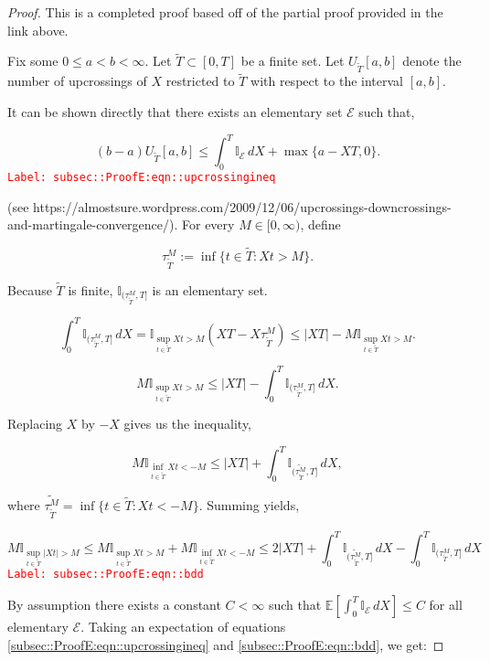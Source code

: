 \documentclass[12pt]{article}
\newcommand{\mb}{\mathbb}
\newcommand{\mc}{\mathcal}
\newcommand{\tr}{\textcolor{red}}
\newcommand{\labe}[1]{\tr{\texttt{Label: #1}}}
\newcommand{\ind}{\hspace{24pt}}
\newcommand{\ex}[1]{\mb{E}\left[#1\right]}			%
\newcommand{\T}{T}								%
\renewcommand{\t}{t}							%
\newcommand{\X}{X}								%
\newcommand{\const}{C}							%
\newcommand{\rt}[1]{\tau^{#1}}						%
\newcommand{\alt}{\widetilde}						%
\newcommand{\evnt}{\mc{E}}						%
\begin{document}
\begin{proof}
This is a completed proof based off of the partial proof provided in the link above.

\ind Fix some \(0\leq a < b < \infty\). Let \(\alt{T} \subset [0,\T]\) be a finite set. Let \(U_{\alt{\T}}[a,b]\) denote the number of upcrossings of \(\X{}{}\) restricted to \(\alt{\T}\) with respect to the interval \([a,b]\).

\ind It can be shown directly that there exists an elementary set \(\evnt\) such that,

\begin{equation}
(b-a)U_{\alt{T}}[a,b] \leq \int_0^\T \mb{I}_{\evnt}\,d\X{}{} + \max\{a - \X{}{\T},0\}.
\label{subsec::ProofE:eqn::upcrossingineq}
\end{equation}
\labe{subsec::ProofE:eqn::upcrossingineq}

(see https://almostsure.wordpress.com/2009/12/06/upcrossings-downcrossings-and-martingale-convergence/). For every \(M \in [0,\infty)\), define

\[\rt{M}_{\alt{T}} := \inf\{\t\in \alt{\T}: \X{}{\t} > M\}.\]

Because \(\alt{T}\) is finite, \(\mb{I}_{(\rt{M}_{\alt{T}},\T]}\) is an elementary set.

\[\int_0^\T \mb{I}_{(\rt{M}_{\alt{T}},\T]}\,d\X{}{} = \mb{I}_{\sup_{\t\in \alt{T}} \X{}{\t} > M}(\X{}{\T} - \X{}{\rt{M}_{\alt{T}}}) \leq |\X{}{\T}| - M\mb{I}_{\sup_{\t \in \alt{T}} \X{}{\t} > M}.\]

\[M\mb{I}_{\sup_{\t\in\alt{T}} \X{}{\t} > M} \leq |\X{}{\T}| - \int_0^T \mb{I}_{(\rt{M}_{\alt{T}},\T]}\,d\X{}{}.\]


Replacing \(\X{}{}\) by \(-\X{}{}\) gives us the inequality,

\[M\mb{I}_{\inf_{\t\in\alt{T}} \X{}{\t} < -M} \leq |\X{}{\T}| + \int_0^T \mb{I}_{(\alt{\rt{M}_{\alt{T}}},\T]}\,d\X{}{},\]

where \(\alt{\rt{M}_{\alt{T}}} = \inf\{\t\in \alt{T}: \X{}{\t} < -M\}\). Summing yields,

\begin{equation}
M\mb{I}_{\sup_{\t\in\alt{T}}|\X{}{\t}| > M} \leq M\mb{I}_{\sup_{\t\in\alt{T}}\X{}{\t} > M} + M\mb{I}_{\inf_{\t\in\alt{T}}\X{}{\t} < -M} \leq 2|\X{}{\T}| + \int_0^\T \mb{I}_{(\alt{\rt{M}_{\alt{T}}},\T]}\,d\X{}{} - \int_0^\T \mb{I}_{(\rt{M}_{\alt{T}},\T]}\,d\X{}{}
\label{subsec::ProofE:eqn::bdd}
\end{equation}
\labe{subsec::ProofE:eqn::bdd}

By assumption there exists a constant \(\const{} < \infty\) such that \(\ex{\int_0^\T \mb{I}_{\evnt}\,d\X{}{}} \leq \const{}\) for all elementary \(\evnt\). Taking an expectation of equations \eqref{subsec::ProofE:eqn::upcrossingineq} and \eqref{subsec::ProofE:eqn::bdd}, we get:


\end{proof}
\end{document}
